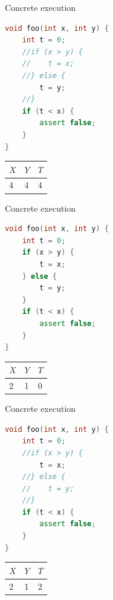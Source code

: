 \documentclass{beamer}
\begin{document}
\begin{frame}[fragile]{Concrete execution}
\begin{minipage}{0.49\textwidth}
\begin{lstlisting}[language=C++]
void foo(int x, int y) {
    int t = 0;
    //if (x > y) {
    //    t = x;
    //} else {
        t = y;
    //}
    if (t < x) {
        assert false;
    }
}
\end{lstlisting}
\end{minipage}
\hfill
\begin{minipage}{0.49\textwidth}
\begin{center}
\begin{tabular}{ | l | l | l | }
\hline
$X$ & $Y$ & $T$ \\
\hline
4 & 4 & 4 \\
\hline
\end{tabular}
\end{center}
\end{minipage}
\end{frame}

\begin{frame}[fragile]{Concrete execution}
\begin{minipage}{0.49\textwidth}
\begin{lstlisting}[language=C++]
void foo(int x, int y) {
    int t = 0;
    if (x > y) {
        t = x;
    } else {
        t = y;
    }
    if (t < x) {
        assert false;
    }
}
\end{lstlisting}
\end{minipage}
\hfill
\begin{minipage}{0.49\textwidth}
\begin{center}
\begin{tabular}{ | l | l | l | }
\hline
$X$ & $Y$ & $T$ \\
\hline
2 & 1 & 0 \\
\hline
\end{tabular}
\end{center}
\end{minipage}
\end{frame}

\begin{frame}[fragile]{Concrete execution}
\begin{minipage}{0.49\textwidth}
\begin{lstlisting}[language=C++]
void foo(int x, int y) {
    int t = 0;
    //if (x > y) {
        t = x;
    //} else {
    //    t = y;
    //}
    if (t < x) {
        assert false;
    }
}
\end{lstlisting}
\end{minipage}
\hfill
\begin{minipage}{0.49\textwidth}
\begin{center}
\begin{tabular}{ | l | l | l | }
\hline
$X$ & $Y$ & $T$ \\
\hline
2 & 1 & 2 \\
\hline
\end{tabular}
\end{center}
\end{minipage}
\end{frame}
\end{document}
